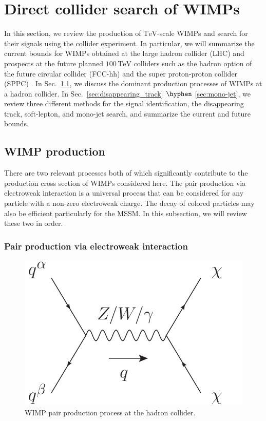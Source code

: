 \documentclass[12pt,twoside,book]{article}
\begin{document}
\section{Direct collider search of WIMPs}
\setcounter{equation}{0}
\label{sec:direct}

\vskip 0.1in

In this section, we review the production of $\mathrm{TeV}$-scale WIMPs and search for their signals using the collider experiment.
In particular, we will summarize the current bounds for WIMPs obtained at the large hadron collider (LHC) and prospects at the future planned $100\,\mathrm{TeV}$ colliders such as the hadron option of the future circular collider (FCC-hh) \cite{Benedikt:2651300} and the super proton-proton collider (SPPC) \cite{CEPC-SPPCStudyGroup:2015csa, CEPC-SPPCStudyGroup:2015esa}.
In Sec.~\ref{sec:wimp_production}, we discuss the dominant production processes of WIMPs at a hadron collider.
In Sec.~\ref{sec:disappearing_track} $\hyphen$ \ref{sec:mono-jet}, we review three different methods for the signal identification, the disappearing track, soft-lepton, and mono-jet search, and summarize the current and future bounds.


\subsection{WIMP production}
\label{sec:wimp_production}

There are two relevant processes both of which significantly contribute to the production cross section of WIMPs considered here.
The pair production via electroweak interaction is a universal process that can be considered for any particle with a non-zero electroweak charge.
The decay of colored particles may also be efficient particularly for the MSSM.
In this subsection, we will review these two in order.


\subsubsection*{Pair production via electroweak interaction}

\begin{figure}[b]
  \centering
  \includegraphics[width=0.4\hsize]{WIMP_production.pdf}
  \caption{WIMP pair production process at the hadron collider.}
  \label{fig:wimp_production}
\end{figure}
\end{document}
